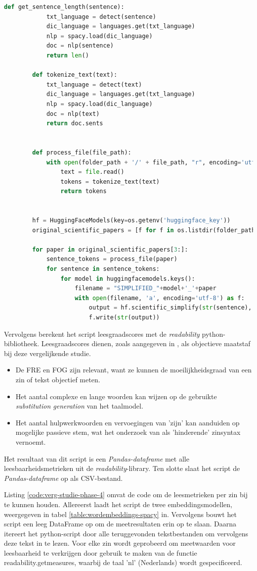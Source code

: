 \begin{center}
\begin{lstlisting}[language=Python, caption={Script voor de derde fase van de vergelijkende studie}, label={code:verg-studie-phase-3}]
		def get_sentence_length(sentence):
			txt_language = detect(sentence)
			dic_language = languages.get(txt_language)
			nlp = spacy.load(dic_language)
			doc = nlp(sentence)
			return len()	
		
		def tokenize_text(text):
			txt_language = detect(text)
			dic_language = languages.get(txt_language)
			nlp = spacy.load(dic_language)
			doc = nlp(text)
			return doc.sents
			
		
		def process_file(file_path):
			with open(folder_path + '/' + file_path, "r", encoding='utf8') as file:
				text = file.read()
				tokens = tokenize_text(text)
				return tokens
				
		
		hf = HuggingFaceModels(key=os.getenv('huggingface_key'))
		original_scientific_papers = [f for f in os.listdir(folder_path)]
		
		for paper in original_scientific_papers[3:]:
			sentence_tokens = process_file(paper) 
			for sentence in sentence_tokens:
				for model in huggingfacemodels.keys():
					filename = "SIMPLIFIED_"+model+'_'+paper
					with open(filename, 'a', encoding='utf-8') as f:
						output = hf.scientific_simplify(str(sentence), model)
						f.write(str(output)) 	
	\end{lstlisting}
\end{center}

Vervolgens berekent het script leesgraadscores met de \textit{readability} python-bibliotheek. Leesgraadscores dienen, zoals aangegeven in \textcite{Nenkova2004}, als objectieve maatstaf bij deze vergelijkende studie. 

\begin{itemize}
	\item De FRE en FOG zijn relevant, want ze kunnen de moeilijkheidsgraad van een zin of tekst objectief meten.
	\item Het aantal complexe en lange woorden kan wijzen op de gebruikte \textit{substitution generation} van het taalmodel.
	\item Het aantal hulpwerkwoorden en vervoegingen van 'zijn' kan aanduiden op mogelijke passieve stem, wat het onderzoek van \textcite{Ruelas2020} als 'hinderende' zinsyntax vernoemt.
\end{itemize}

Het resultaat van dit script is een \textit{Pandas-dataframe} met alle leesbaarheidsmetrieken uit de \textit{readability}-library. Ten slotte slaat het script de \textit{Pandas-dataframe} op als CSV-bestand.

Listing \ref{code:verg-studie-phase-4} omvat de code om de leesmetrieken per zin bij te kunnen houden. Allereerst laadt het script de twee embeddingsmodellen, weergegeven in tabel \ref{table:wordembeddings-spacy} in. Vervolgens bouwt het script een leeg DataFrame op om de meetresultaten erin op te slaan. Daarna itereert het python-script door alle teruggevonden tekstbestanden om vervolgens deze tekst in te lezen. Voor elke zin wordt geprobeerd om meetwaarden voor leesbaarheid te verkrijgen door gebruik te maken van de functie readability.getmeasures, waarbij de taal 'nl' (Nederlands) wordt gespecificeerd. 


